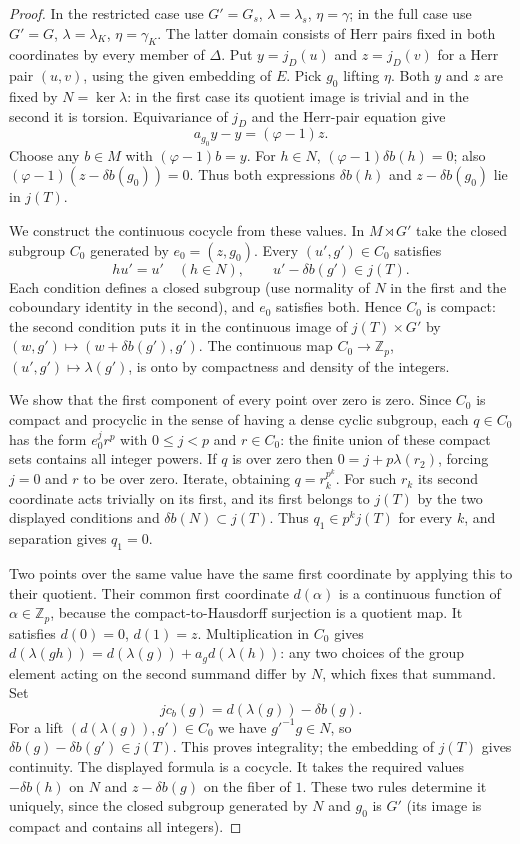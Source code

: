 \begin{proof}
In the restricted case use $G'=G_s$, $\lambda=\lambda_s$,
$\eta=\gamma$; in the full case use $G'=G$, $\lambda=\lambda_K$,
$\eta=\gamma_K$. The latter domain consists of Herr pairs fixed
in both coordinates by every member of $\Delta$. Put
$y=j_D(u)$ and $z=j_D(v)$ for a Herr pair $(u,v)$, using the
given embedding of $E$. Pick $g_0$ lifting $\eta$. Both $y$ and $z$
are fixed by $N=\ker\lambda$: in the first case its quotient image
is trivial and in the second it is torsion. Equivariance of $j_D$
and the Herr-pair equation give
\[
           a_{g_0}y-y=(\varphi-1)z.
\]
Choose any $b\in M$ with $(\varphi-1)b=y$. For $h\in N$,
$(\varphi-1)\delta b(h)=0$; also
$(\varphi-1)(z-\delta b(g_0))=0$. Thus both expressions
$\delta b(h)$ and $z-\delta b(g_0)$ lie in $j(T)$.

We construct the continuous cocycle from these values. In
$M\rtimes G'$ take the closed subgroup $C_0$ generated by
$e_0=(z,g_0)$. Every $(u',g')\in C_0$ satisfies
\[
   h u'=u'\quad(h\in N),\qquad u'-\delta b(g')\in j(T).
\]
Each condition defines a closed subgroup (use normality of $N$ in
the first and the coboundary identity in the second), and $e_0$
satisfies both. Hence $C_0$ is compact: the second condition
puts it in the continuous image of $j(T)\times G'$ by
$(w,g')\mapsto(w+\delta b(g'),g')$. The continuous map
$C_0\to\mathbb Z_p$, $(u',g')\mapsto\lambda(g')$, is onto by
compactness and density of the integers.

We show that the first component of every point over zero is zero.
Since $C_0$ is compact and procyclic in the sense of having a dense
cyclic subgroup, each $q\in C_0$ has the form $e_0^j r^p$ with
$0\le j<p$ and $r\in C_0$: the finite union of these compact sets
contains all integer powers. If $q$ is over zero then
$0=j+p\lambda(r_2)$, forcing $j=0$ and $r$ to be over zero.
Iterate, obtaining $q=r_k^{p^k}$. For such $r_k$ its second
coordinate acts trivially on its first, and its first belongs to
$j(T)$ by the two displayed conditions and $\delta b(N)\subset j(T)$.
Thus $q_1\in p^kj(T)$ for every $k$, and separation gives $q_1=0$.

Two points over the same value have the same first coordinate by
applying this to their quotient. Their common first coordinate
$d(\alpha)$ is a continuous function of $\alpha\in\mathbb Z_p$,
because the compact-to-Hausdorff surjection is a quotient map.
It satisfies $d(0)=0$, $d(1)=z$. Multiplication in $C_0$ gives
$d(\lambda(g h))=d(\lambda(g))+a_g d(\lambda(h))$:
any two choices of the group element acting on the second summand
differ by $N$, which fixes that summand. Set
\[
             j c_b(g)=d(\lambda(g))-\delta b(g).
\]
For a lift $(d(\lambda(g)),g')\in C_0$ we have
$g'^{-1}g\in N$, so $\delta b(g)-\delta b(g')\in j(T)$.
This proves integrality; the embedding of $j(T)$ gives continuity.
The displayed formula is a cocycle. It takes the required values
$-\delta b(h)$ on $N$ and $z-\delta b(g)$ on the fiber of $1$.
These two rules determine it uniquely, since the closed subgroup
generated by $N$ and $g_0$ is $G'$ (its image is compact and
contains all integers).


\end{proof}
